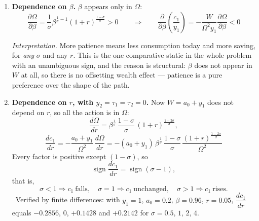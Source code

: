 \documentclass[12pt, letterpaper]{article}
\newcommand{\pd}[2]{\dfrac{\partial #1}{\partial #2}}
\newcommand{\dd}[2]{\dfrac{d #1}{d #2}}
\begin{document}
\begin{tcolorbox}[oddbox,title={Problem 6.1 \quad Two-Period Problem with Taxes and Initial Wealth}]
\begin{enumerate}
\smallskip
\emph{Interpretation.} The ratio of consumption to current income is \textbf{not a
preference parameter}. Two households with identical $\beta$, $\sigma$ and current income
will have different saving rates if their balance sheets differ. Three consequences:
\begin{itemize}[leftmargin=1.3em,itemsep=2pt,topsep=3pt]
\item Cross-sectional saving rates cannot be read as evidence about thrift. The elderly have
      accumulated $a_0$ and so consume a high fraction of current income; the young have not.
\item There is a \textbf{wealth effect} on consumption: a rise in house or equity prices
      raises $a_0$ and therefore raises consumption immediately, without any change in
      income. This is one of the main channels through which asset markets reach the real
      economy.
\item Aggregate saving rates fall when aggregate wealth rises, which is one candidate
      explanation for the long decline of measured US household saving.
\end{itemize}

\item \textbf{Dependence on $\beta$.} $\beta$ appears only in $\Omega$:
\[
\pd{\Omega}{\beta}=\frac{1}{\sigma}\beta^{\frac{1}{\sigma}-1}(1+r)^{\frac{1-\sigma}{\sigma}}>0
\qquad\Longrightarrow\qquad
\boxed{\pd{}{\beta}\left(\frac{c_1}{y_1}\right)
=-\frac{W}{\Omega^{2}y_1}\pd{\Omega}{\beta}<0}
\]
\checkmark

\smallskip
\emph{Interpretation.} More patience means less consumption today and more saving, for
\emph{any} $\sigma$ and any $r$. This is the one comparative static in the whole problem
with an unambiguous sign, and the reason is structural: $\beta$ does not appear in $W$ at
all, so there is no offsetting wealth effect --- patience is a pure preference over the
shape of the path.

\item \textbf{Dependence on $r$, with $y_2=\tau_1=\tau_2=0$.} Now $W=a_0+y_1$ does not
depend on $r$, so all the action is in $\Omega$:
\[
\dd{\Omega}{r}=\beta^{\frac{1}{\sigma}}\,\frac{1-\sigma}{\sigma}\,
(1+r)^{\frac{1-2\sigma}{\sigma}} ,
\]
\[
\boxed{\;\dd{c_1}{r}=-\frac{a_0+y_1}{\Omega^{2}}\,\dd{\Omega}{r}
=-(a_0+y_1)\,\beta^{\frac{1}{\sigma}}\,\frac{1-\sigma}{\sigma}\,
\frac{(1+r)^{\frac{1-2\sigma}{\sigma}}}{\Omega^{2}}\;}
\]
Every factor is positive except $(1-\sigma)$, so
\[
\operatorname{sign}\dd{c_1}{r}=\operatorname{sign}(\sigma-1),
\]
that is,
\[
\sigma<1\Rightarrow c_1\ \text{falls},
\quad
\sigma=1\Rightarrow c_1\ \text{unchanged},
\quad
\sigma>1\Rightarrow c_1\ \text{rises}.
\]
\checkmark\ Verified by finite differences: with $y_1=1$, $a_0=0.2$, $\beta=0.96$,
$r=0.05$, $\dd{c_1}{r}$ equals $-0.2856$, $0$, $+0.1428$ and $+0.2142$ for
$\sigma=0.5,\,1,\,2,\,4$.


\end{enumerate}
\end{tcolorbox}
\end{document}
